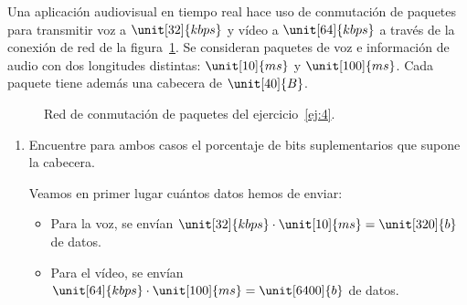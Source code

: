 \begin{ejercicio}\label{ej:4}
    Una aplicación audiovisual en tiempo real hace uso de conmutación de paquetes para transmitir voz a $\unit[32]{kbps}$ y vídeo a $\unit[64]{kbps}$ a través de la conexión de red de la figura~\ref{fig:ej4}.  Se consideran paquetes de voz e información de audio con dos longitudes distintas: $\unit[10]{ms}$ y $\unit[100]{ms}$. Cada paquete tiene además una cabecera de $\unit[40]{B}$.
    \begin{figure}
        \centering
        \caption{Red de conmutación de paquetes del ejercicio~\ref{ej:4}.}
        \label{fig:ej4}
    \end{figure}

    \begin{enumerate}
        \item Encuentre para ambos casos el porcentaje de bits suplementarios que supone la cabecera.
        
        Veamos en primer lugar cuántos datos hemos de enviar:
        \begin{itemize}
            \item Para la voz, se envían $\unit[32]{kbps}\cdot \unit[10]{ms} = \unit[320]{b}$ de datos.
            \item Para el vídeo, se envían $\unit[64]{kbps}\cdot \unit[100]{ms} = \unit[6400]{b}$ de datos.
        \end{itemize}


\end{enumerate}
\end{ejercicio}
